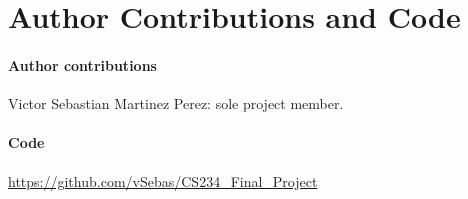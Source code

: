 \section{Author Contributions and Code}

\paragraph{Author contributions}
Victor Sebastian Martinez Perez: sole project member.

\paragraph{Code}
\url{https://github.com/vSebas/CS234_Final_Project}

